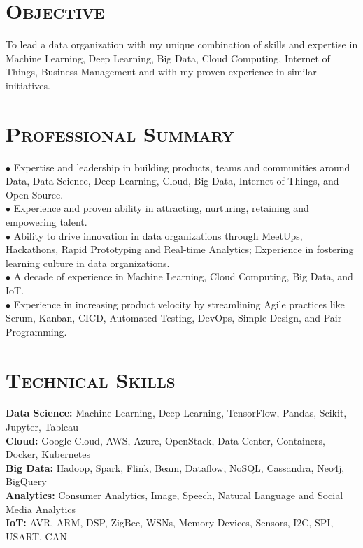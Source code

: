 \begin{resume}


\section{\textsc{Objective}} To lead a data organization with my unique combination of skills and expertise in Machine Learning, Deep Learning, Big Data, Cloud Computing, Internet of Things, Business Management and with my proven experience in similar initiatives.
\section{\textsc{Professional Summary}}
$\bullet$ Expertise and leadership in building products, teams and communities around Data, Data Science, Deep Learning, Cloud, Big Data, Internet of Things, and Open Source.\\
$\bullet$ Experience and proven ability in attracting, nurturing, retaining and empowering talent.\\
$\bullet$ Ability to drive innovation in data organizations through MeetUps, Hackathons, Rapid Prototyping and Real-time Analytics; Experience in fostering learning culture in data organizations.\\
$\bullet$ A decade of experience in Machine Learning, Cloud Computing, Big Data, and IoT.\\
$\bullet$ Experience in increasing product velocity by streamlining Agile practices like Scrum, Kanban, CICD, Automated Testing, DevOps, Simple Design, and Pair Programming.

\section{\textsc{Technical Skills}}
{\bf Data Science:} Machine Learning, Deep Learning, TensorFlow, Pandas, Scikit, Jupyter, Tableau\\
{\bf Cloud:} Google Cloud, AWS, Azure, OpenStack, Data Center, Containers, Docker, Kubernetes \\
{\bf Big Data:} Hadoop, Spark, Flink, Beam, Dataflow, NoSQL, Cassandra, Neo4j, BigQuery\\
{\bf Analytics:} Consumer Analytics, Image, Speech, Natural Language and Social Media Analytics\\
{\bf IoT:} AVR, ARM, DSP, ZigBee, WSNs, Memory Devices, Sensors, I2C, SPI, USART, CAN


\end{resume}
